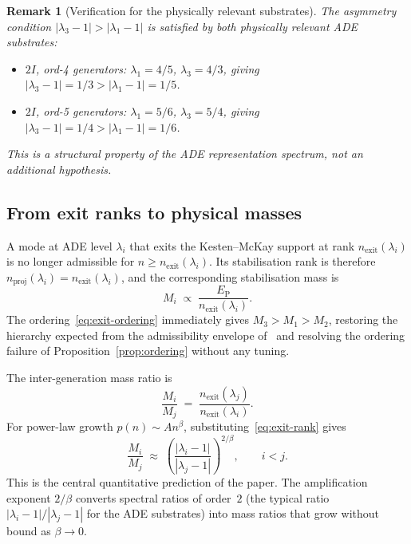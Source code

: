 \documentclass[11pt,a4paper]{article}
\newtheorem{remark}[theorem]{Remark}
\newcommand{\nexit}{n_{\mathrm{exit}}}
\newcommand{\EP}{E_{\mathrm{P}}}
\begin{document}
      \begin{remark}[Verification for the physically relevant substrates]
        \label{rem:asymmetry}
        The asymmetry condition $|\lambda_3 - 1| > |\lambda_1 - 1|$ is
        satisfied by both physically relevant ADE substrates:
        \begin{itemize}[nosep]
    \item $2I$, ord-4 generators: $\lambda_1 = 4/5$, $\lambda_3 = 4/3$,
    giving $|\lambda_3 - 1| = 1/3 > |\lambda_1 - 1| = 1/5$.\quad\checkmark
    \item $2I$, ord-5 generators: $\lambda_1 = 5/6$, $\lambda_3 = 5/4$,
    giving $|\lambda_3 - 1| = 1/4 > |\lambda_1 - 1| = 1/6$.\quad\checkmark
        \end{itemize}
        This is a structural property of the ADE representation spectrum,
        not an additional hypothesis.
      \end{remark}

    \subsection{From exit ranks to physical masses}
      \label{subsec:mass-interpretation}

      A mode at ADE level $\lambda_i$ that exits the Kesten--McKay support at
      rank $\nexit(\lambda_i)$ is no longer admissible for $n \geq \nexit(\lambda_i)$.
      Its stabilisation rank is therefore $n_{\mathrm{proj}}(\lambda_i) = \nexit(\lambda_i)$,
      and the corresponding stabilisation mass is
      \begin{equation}
        \label{eq:mass-exit}
        M_i \;\propto\; \frac{\EP}{\nexit(\lambda_i)}.
      \end{equation}
      The ordering~\eqref{eq:exit-ordering} immediately gives
      $M_3 > M_1 > M_2$,
      restoring the hierarchy expected from the admissibility
      envelope of~\cite{Beau2026a4} and resolving the ordering failure
      of Proposition~\ref{prop:ordering} without any tuning.

      The inter-generation mass ratio is
      \begin{equation}
        \label{eq:mass-ratio-exit}
        \frac{M_i}{M_j}
        \;=\; \frac{\nexit(\lambda_j)}{\nexit(\lambda_i)}.
      \end{equation}
      For power-law growth $p(n) \sim A n^{\beta}$,
      substituting~\eqref{eq:exit-rank} gives
      \begin{equation}
        \label{eq:mass-ratio-powerlaw}
        \frac{M_i}{M_j}
        \;\approx\;
        \left(\frac{|\lambda_i - 1|}{|\lambda_j - 1|}\right)^{2/\beta},
        \qquad i < j.
      \end{equation}
      This is the central quantitative prediction of the paper.
      The amplification exponent $2/\beta$ converts spectral ratios of order~$2$
      (the typical ratio $|\lambda_i-1|/|\lambda_j-1|$ for the ADE substrates)
      into mass ratios that grow without bound as $\beta \to 0$.
\end{document}
